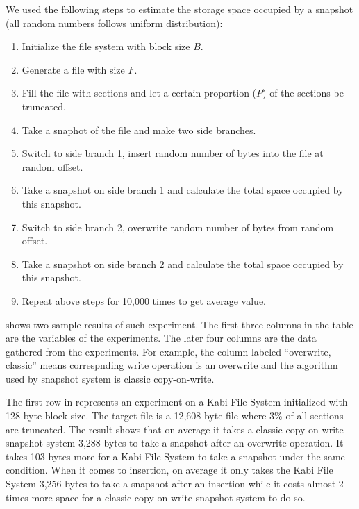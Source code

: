     We used the following steps to estimate the storage space occupied by a snapshot (all random numbers follows uniform distribution):

\begin{enumerate}

	\item Initialize the file system with block size $B$.

	\item Generate a file with size $F$.

	\item Fill the file with sections and let a certain proportion ($P$) of the sections be truncated.

	\item Take a snaphot of the file and make two side branches.
	
	\item Switch to side branch 1, insert random number of bytes into the file at random offset.

	\item Take a snapshot on side branch 1 and calculate the total space occupied by this snapshot.

	\item Switch to side branch 2, overwrite random number of bytes from random offset.

	\item Take a snapshot on side branch 2 and calculate the total space occupied by this snapshot.

	\item Repeat above steps for 10,000 times to get average value.

\end{enumerate}

     shows two sample results of such experiment. The first three columns in the table are the variables of the experiments. The later four columns are the data gathered from the experiments. For example, the column labeled ``overwrite, classic'' means correspnding write operation is an overwrite and the algorithm used by snapshot system is classic copy-on-write.

    The first row in  represents an experiment on a Kabi File System initialized with 128-byte block size. The target file is a 12,608-byte file where 3\% of all sections are truncated. The result shows that on average it takes a classic copy-on-write snapshot system 3,288 bytes to take a snapshot after an overwrite operation. It takes 103 bytes more for a Kabi File System to take a snapshot under the same condition. When it comes to insertion, on average it only takes the Kabi File System 3,256 bytes to take a snapshot after an insertion while it costs almost 2 times more space for a classic copy-on-write snapshot system to do so.

